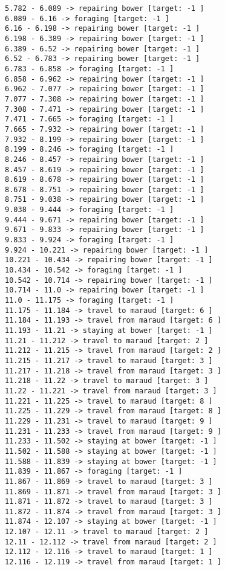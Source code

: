 \documentclass[11pt]{article}
\begin{document}
\begin{Verbatim}[commandchars=\\\{\}]
5.782 - 6.089 -> repairing bower [target: -1 ]
6.089 - 6.16 -> foraging [target: -1 ]
6.16 - 6.198 -> repairing bower [target: -1 ]
6.198 - 6.389 -> repairing bower [target: -1 ]
6.389 - 6.52 -> repairing bower [target: -1 ]
6.52 - 6.783 -> repairing bower [target: -1 ]
6.783 - 6.858 -> foraging [target: -1 ]
6.858 - 6.962 -> repairing bower [target: -1 ]
6.962 - 7.077 -> repairing bower [target: -1 ]
7.077 - 7.308 -> repairing bower [target: -1 ]
7.308 - 7.471 -> repairing bower [target: -1 ]
7.471 - 7.665 -> foraging [target: -1 ]
7.665 - 7.932 -> repairing bower [target: -1 ]
7.932 - 8.199 -> repairing bower [target: -1 ]
8.199 - 8.246 -> foraging [target: -1 ]
8.246 - 8.457 -> repairing bower [target: -1 ]
8.457 - 8.619 -> repairing bower [target: -1 ]
8.619 - 8.678 -> repairing bower [target: -1 ]
8.678 - 8.751 -> repairing bower [target: -1 ]
8.751 - 9.038 -> repairing bower [target: -1 ]
9.038 - 9.444 -> foraging [target: -1 ]
9.444 - 9.671 -> repairing bower [target: -1 ]
9.671 - 9.833 -> repairing bower [target: -1 ]
9.833 - 9.924 -> foraging [target: -1 ]
9.924 - 10.221 -> repairing bower [target: -1 ]
10.221 - 10.434 -> repairing bower [target: -1 ]
10.434 - 10.542 -> foraging [target: -1 ]
10.542 - 10.714 -> repairing bower [target: -1 ]
10.714 - 11.0 -> repairing bower [target: -1 ]
11.0 - 11.175 -> foraging [target: -1 ]
11.175 - 11.184 -> travel to maraud [target: 6 ]
11.184 - 11.193 -> travel from maraud [target: 6 ]
11.193 - 11.21 -> staying at bower [target: -1 ]
11.21 - 11.212 -> travel to maraud [target: 2 ]
11.212 - 11.215 -> travel from maraud [target: 2 ]
11.215 - 11.217 -> travel to maraud [target: 3 ]
11.217 - 11.218 -> travel from maraud [target: 3 ]
11.218 - 11.22 -> travel to maraud [target: 3 ]
11.22 - 11.221 -> travel from maraud [target: 3 ]
11.221 - 11.225 -> travel to maraud [target: 8 ]
11.225 - 11.229 -> travel from maraud [target: 8 ]
11.229 - 11.231 -> travel to maraud [target: 9 ]
11.231 - 11.233 -> travel from maraud [target: 9 ]
11.233 - 11.502 -> staying at bower [target: -1 ]
11.502 - 11.588 -> staying at bower [target: -1 ]
11.588 - 11.839 -> staying at bower [target: -1 ]
11.839 - 11.867 -> foraging [target: -1 ]
11.867 - 11.869 -> travel to maraud [target: 3 ]
11.869 - 11.871 -> travel from maraud [target: 3 ]
11.871 - 11.872 -> travel to maraud [target: 3 ]
11.872 - 11.874 -> travel from maraud [target: 3 ]
11.874 - 12.107 -> staying at bower [target: -1 ]
12.107 - 12.11 -> travel to maraud [target: 2 ]
12.11 - 12.112 -> travel from maraud [target: 2 ]
12.112 - 12.116 -> travel to maraud [target: 1 ]
12.116 - 12.119 -> travel from maraud [target: 1 ]

\end{Verbatim}
\end{document}
